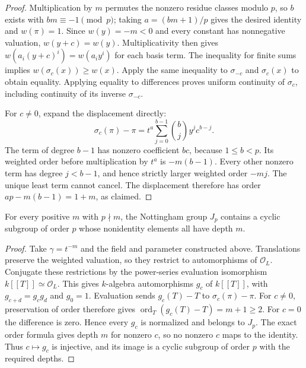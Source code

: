 \begin{proof}
Multiplication by $m$ permutes the nonzero residue classes modulo
$p$, so $b$ exists with $bm\equiv-1\pmod p$; taking
$a=(bm+1)/p$ gives the desired identity and $w(\pi)=1$.
Since $w(y)=-m<0$ and every constant has nonnegative valuation,
$w(y+c)=w(y)$. Multiplicativity then gives
$w(a_i(y+c)^i)=w(a_i y^i)$ for each basis term. The inequality
for finite sums implies $w(\sigma_c(x))\ge w(x)$.
Apply the same inequality to $\sigma_{-c}$ and $\sigma_c(x)$
to obtain equality. Applying equality to differences proves
uniform continuity of $\sigma_c$, including continuity of its
inverse $\sigma_{-c}$.

For $c\ne0$, expand the displacement directly:
\[
 \sigma_c(\pi)-\pi
 =t^a\sum_{j=0}^{b-1}\binom bj y^j c^{b-j}.
\]
The term of degree $b-1$ has nonzero coefficient $bc$,
because $1\le b<p$. Its weighted order before multiplication
by $t^a$ is $-m(b-1)$. Every other nonzero term has degree
$j<b-1$, and hence strictly larger weighted order $-mj$.
The unique least term cannot cancel. The displacement therefore
has order $ap-m(b-1)=1+m$, as claimed.
\end{proof}

\begin{theorem}
\label{thm:nottingham-cyclic-prescribed-depth}
\leanok
For every positive $m$ with $p\nmid m$, the Nottingham group
$J_p$ contains a cyclic subgroup of order $p$ whose nonidentity
elements all have depth $m$.
\end{theorem}

\begin{proof}
Take $\gamma=t^{-m}$ and the field and parameter constructed
above. Translations preserve the weighted valuation, so they restrict
to automorphisms of $\mathcal O_L$. Conjugate these restrictions by
the power-series evaluation isomorphism
$k[[T]]\simeq\mathcal O_L$. This gives $k$-algebra automorphisms
$g_c$ of $k[[T]]$, with $g_{c+d}=g_cg_d$ and $g_0=1$.
Evaluation sends $g_c(T)-T$ to $\sigma_c(\pi)-\pi$.
For $c\ne0$, preservation of order therefore gives
$\operatorname{ord}_T(g_c(T)-T)=m+1\ge2$.
For $c=0$ the difference is zero. Hence every $g_c$ is normalized
and belongs to $J_p$. The exact order formula gives depth $m$
for nonzero $c$, so no nonzero $c$ maps to the identity.
Thus $c\mapsto g_c$ is injective, and its image is a cyclic
subgroup of order $p$ with the required depths.
\end{proof}
